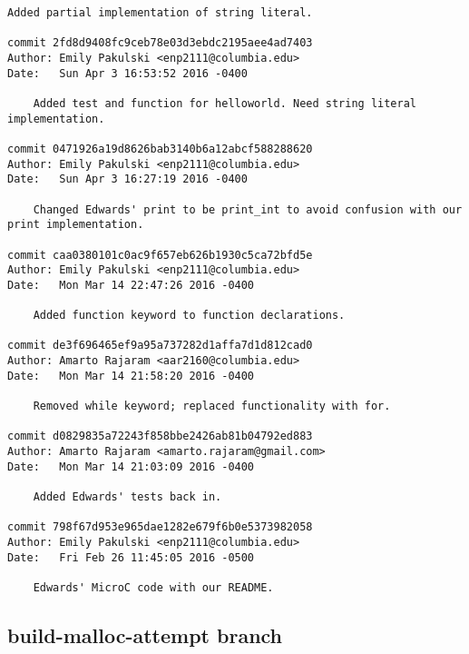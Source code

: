 \begin{lstlisting}[backgroundcolor=\color{white}]
    Added partial implementation of string literal.

commit 2fd8d9408fc9ceb78e03d3ebdc2195aee4ad7403
Author: Emily Pakulski <enp2111@columbia.edu>
Date:   Sun Apr 3 16:53:52 2016 -0400

    Added test and function for helloworld. Need string literal implementation.

commit 0471926a19d8626bab3140b6a12abcf588288620
Author: Emily Pakulski <enp2111@columbia.edu>
Date:   Sun Apr 3 16:27:19 2016 -0400

    Changed Edwards' print to be print_int to avoid confusion with our print implementation.

commit caa0380101c0ac9f657eb626b1930c5ca72bfd5e
Author: Emily Pakulski <enp2111@columbia.edu>
Date:   Mon Mar 14 22:47:26 2016 -0400

    Added function keyword to function declarations.

commit de3f696465ef9a95a737282d1affa7d1d812cad0
Author: Amarto Rajaram <aar2160@columbia.edu>
Date:   Mon Mar 14 21:58:20 2016 -0400

    Removed while keyword; replaced functionality with for.

commit d0829835a72243f858bbe2426ab81b04792ed883
Author: Amarto Rajaram <amarto.rajaram@gmail.com>
Date:   Mon Mar 14 21:03:09 2016 -0400

    Added Edwards' tests back in.

commit 798f67d953e965dae1282e679f6b0e5373982058
Author: Emily Pakulski <enp2111@columbia.edu>
Date:   Fri Feb 26 11:45:05 2016 -0500

    Edwards' MicroC code with our README.

    \end{lstlisting}

\subsection{build-malloc-attempt branch}

